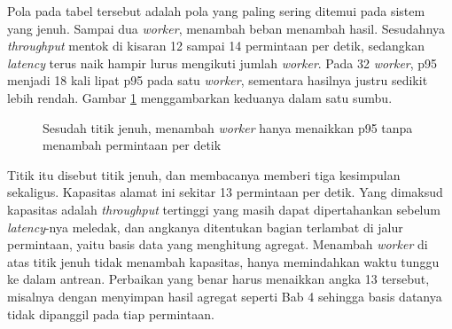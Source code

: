 Pola pada tabel tersebut adalah pola yang paling sering ditemui pada sistem
yang jenuh. Sampai dua \textit{worker}, menambah beban menambah hasil.
Sesudahnya \textit{throughput} mentok di kisaran 12 sampai 14 permintaan per
detik, sedangkan \textit{latency} terus naik hampir lurus mengikuti jumlah
\textit{worker}. Pada 32 \textit{worker}, p95 menjadi 18 kali lipat p95 pada
satu \textit{worker}, sementara hasilnya justru sedikit lebih rendah. Gambar \ref{fig:jenuh}
menggambarkan keduanya dalam satu sumbu.

\begin{figure}[!htb]
  \centering
  \caption{Sesudah titik jenuh, menambah \textit{worker} hanya menaikkan p95
           tanpa menambah permintaan per detik}
  \label{fig:jenuh}
\end{figure}

Titik itu disebut titik jenuh, dan membacanya memberi tiga kesimpulan
sekaligus. Kapasitas alamat ini sekitar 13 permintaan per detik. Yang
dimaksud kapasitas adalah \textit{throughput} tertinggi yang masih dapat
dipertahankan sebelum \textit{latency}-nya meledak, dan angkanya ditentukan
bagian terlambat di jalur permintaan, yaitu basis data yang menghitung
agregat. Menambah \textit{worker} di atas titik jenuh tidak menambah
kapasitas, hanya memindahkan waktu tunggu ke dalam antrean. Perbaikan yang
benar harus menaikkan angka 13 tersebut, misalnya dengan menyimpan hasil
agregat seperti Bab 4 sehingga basis datanya tidak dipanggil pada tiap
permintaan.

